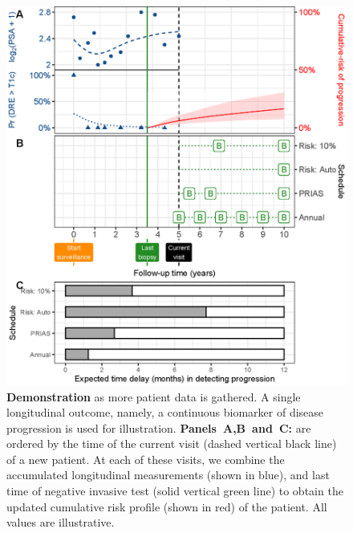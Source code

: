 \begin{figure}
\centerline{\includegraphics{images/demo_schedule.eps}}
\caption{\textbf{Demonstration } as more patient data is gathered. A single longitudinal outcome, namely, a continuous biomarker of disease progression is used for illustration. \textbf{Panels~A,B~and~C:} are ordered by the time of the current visit (dashed vertical black line) of a new patient. At each of these visits, we combine the accumulated longitudinal measurements (shown in blue), and last time of negative invasive test (solid vertical green line) to obtain the updated cumulative risk profile (shown in red) of the patient. All values are illustrative.} 
\label{fig:demo_schedule}
\end{figure}